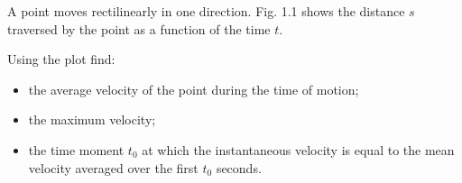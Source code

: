 
\item A point moves rectilinearly in one direction. Fig. 1.1 shows the distance \( s \) traversed by the point as a function of the time \( t \).
    \begin{center}
    \end{center}
Using the plot find:
\begin{itemize}
    \item the average velocity of the point during the time of motion;
    \item the maximum velocity;
    \item the time moment \( t_0 \) at which the instantaneous velocity is equal to the mean velocity averaged over the first \( t_0 \) seconds.
\end{itemize}
